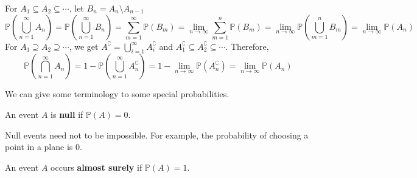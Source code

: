 \documentclass{huhtakm-template-book}
\newcommand{\prob}{\mathbb{P}}
\begin{document}
    \begin{proofing}
        For $A_{1}\subseteq A_{2}\subseteq\cdots$, let $B_{n}=A_{n}\setminus A_{n-1}$
        \begin{equation*}
		    \prob\left(\bigcup_{n=1}^{\infty}A_{n}\right)=\prob\left(\bigcup_{n=1}^{\infty}B_{n}\right)=\sum_{m=1}^{\infty}\prob(B_{m})=\lim_{n\to\infty}\sum_{m=1}^{n}\prob(B_{m})=\lim_{n\to\infty}\prob\left(\bigcup_{m=1}^{n}B_{m}\right)=\lim_{n\to\infty}\prob(A_{n})
        \end{equation*}
	    For $A_{1}\supseteq A_{2}\supseteq\cdots$, we get $A^{\complement}=\bigcup_{i=1}^{\infty}A_{i}^{\complement}$ and $A_{1}^{\complement}\subseteq A_{2}^{\complement}\subseteq\cdots$. Therefore,
        \begin{equation*}
            \prob\left(\bigcap_{n=1}^{\infty}A_{n}\right)=1-\prob\left(\bigcup_{n=1}^{\infty}A_{n}^{\complement}\right)=1-\lim_{n\to\infty}\prob(A_{n}^{\complement})=\lim_{n\to\infty}\prob(A_{n})
        \end{equation*}
    \end{proofing}
    We can give some terminology to some special probabilities.
    \begin{defn} %
        An event $A$ is \textbf{null} if $\prob(A)=0$.
    \end{defn}
    \begin{rem}
        Null events need not to be impossible. For example, the probability of choosing a point in a plane is $0$.
    \end{rem}
    \begin{defn} %
        An event $A$ occurs \textbf{almost surely} if $\prob(A)=1$.
    \end{defn}
    \newpage
\end{document}
